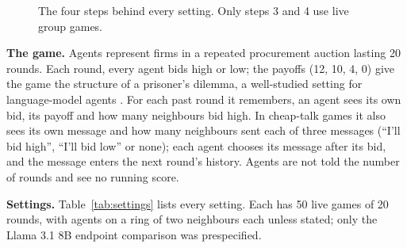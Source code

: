 \documentclass[11pt,letterpaper]{article}
\begin{document}
\begin{figure}[H]
  \centering
  \caption*{The four steps behind every setting. Only steps 3 and 4 use live group games.}
\end{figure}

\textbf{The game.}
Agents represent firms in a repeated procurement auction lasting 20 rounds.
Each round, every agent bids high or low; the payoffs (12, 10, 4, 0) give the game the structure of a prisoner's dilemma, a well-studied setting for language-model agents \citep{akata2025,lore2026}.
For each past round it remembers, an agent sees its own bid, its payoff and how many neighbours bid high.
In cheap-talk games it also sees its own message and how many neighbours sent each of three messages (``I'll bid high'', ``I'll bid low'' or none); each agent chooses its message after its bid, and the message enters the next round's history.
Agents are not told the number of rounds and see no running score.

\textbf{Settings.}
Table~\ref{tab:settings} lists every setting.
Each has 50 live games of 20 rounds, with agents on a ring of two neighbours each unless stated; only the Llama 3.1 8B endpoint comparison was prespecified.
\end{document}
